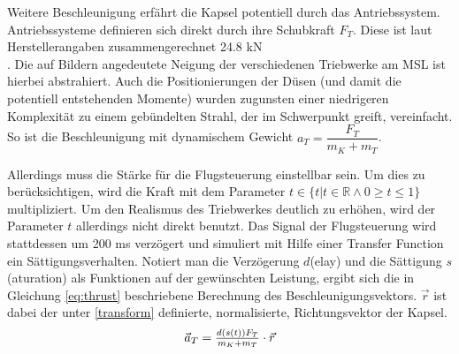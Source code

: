 Weitere Beschleunigung erfährt die Kapsel potentiell durch das Antriebssystem. Antriebssysteme definieren sich direkt durch ihre Schubkraft $F_T$. Diese ist laut Herstellerangaben zusammengerechnet 24.8 kN\\ \cite{AerojetRocketdyne2012} \cite{AerojetRocketdyne}. Die auf Bildern angedeutete Neigung der verschiedenen Triebwerke am MSL ist hierbei abstrahiert. Auch die Positionierungen der Düsen (und damit die potentiell entstehenden Momente) wurden zugunsten einer niedrigeren Komplexität zu einem gebündelten Strahl, der im Schwerpunkt greift, vereinfacht. So ist die Beschleunigung mit dynamischem Gewicht $ a_T = \dfrac{F_T}{m_K + m_T}$.

Allerdings muss die Stärke für die Flugsteuerung einstellbar sein. Um dies zu berücksichtigen, wird die Kraft mit dem Parameter $t \in \{t | t \in \mathbb{R} \land 0 \geq t \leq 1\}$ multipliziert. Um den Realismus des Triebwerkes deutlich zu erhöhen, wird der Parameter $t$ allerdings nicht direkt benutzt. Das Signal der Flugsteuerung wird stattdessen um 200 ms verzögert und simuliert mit Hilfe einer Transfer Function ein Sättigungsverhalten. Notiert man die Verzögerung $d$(elay) und die Sättigung $s$(aturation) als Funktionen auf der gewünschten Leistung, ergibt sich die in Gleichung \ref{eq:thrust} beschriebene Berechnung des Beschleunigungsvektors. $\vec r$ ist dabei der unter \ref{transform} definierte, normalisierte, Richtungsvektor der Kapsel.
\begin{equation}
	$$\vec a_{T} = \frac{d(s(t))F_T}{m_K + m_T} \cdot \vec r$$\\
	\label{eq:thrust}
\end{equation}
